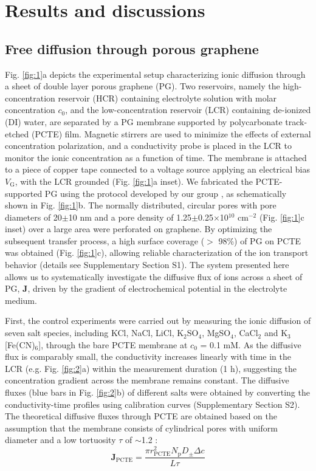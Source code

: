 \documentclass[journal=langd5,email=true, hyperref=true, keywords=false]{achemso}
\newcommand{\Fig}{Fig.}
\begin{document}
\section{Results and discussions}
\label{sec:res}

\subsection{Free diffusion through porous graphene}
\label{sec:res-1}

\Fig{} \ref{fig:1}a depicts the experimental setup characterizing
ionic diffusion through a sheet of double layer porous graphene
(PG). Two reservoirs, namely the high-concentration reservoir (HCR)
containing electrolyte solution with molar concentration $c_0$, and
the low-concentration reservoir (LCR) containing de-ionized (DI)
water, are separated by a PG membrane supported by polycarbonate
track-etched (PCTE) film. Magnetic stirrers are used to minimize the
effects of external concentration polarization, and a conductivity
probe is placed in the LCR to monitor the ionic concentration as a
function of time. The membrane is attached to a piece of copper tape
connected to a voltage source applying an electrical bias
$V_{\mathrm{G}}$, with the LCR grounded (\Fig{} \ref{fig:1}a
inset). We fabricated the PCTE-supported PG using the protocol
developed by our group \cite{Choi_2018}, as schematically shown in
\Fig{} \ref{fig:1}b. The normally distributed, circular pores with
pore diameters of 20$\pm$10 nm and a pore density of
1.25$\pm$0.25$\times$10$^{10}$ cm$^{-2}$ (\Fig{} \ref{fig:1}c inset) over a
large area were perforated on graphene.  By optimizing the subsequent
transfer process, a high surface coverage ($>$ 98\%) of PG on PCTE was
obtained (\Fig{} \ref{fig:1}c), allowing reliable characterization of
the ion transport behavior (details see Supplementary 
Section S1).  The system presented here allows us to systematically
investigate the diffusive flux of ions across a sheet of PG,
$\boldsymbol{J}$, driven by the gradient of electrochemical potential
in the electrolyte medium.

First, the control experiments were carried out by measuring the ionic
diffusion of seven salt species, including KCl, NaCl, LiCl,
K$_{2}$SO$_{4}$, MgSO$_{4}$, CaCl$_{2}$ and K$_{3}$[Fe(CN)$_{6}$],
through the bare PCTE membrane at $c_{0}$ = 0.1 mM. As the diffusive
flux is comparably small, the conductivity increases linearly with time in the LCR
(e.g. \Fig{} \ref{fig:2}a) within the measurement duration (1 h),
suggesting the concentration gradient across the membrane remains 
constant. The diffusive fluxes (blue bars in \Fig{} \ref{fig:2}b) of different salts were
obtained by converting the conductivity-time profiles using
calibration curves (Supplementary Section S2). The theoretical diffusive fluxes through PCTE are obtained based on the assumption that the
membrane consists of cylindrical pores with uniform diameter and a low
tortuosity $\tau$ of $\sim{}$1.2 \cite{O_Hern_2012}:
\begin{equation}
  \label{eq:j-pcte}
  \boldsymbol{J}_{\mathrm{PCTE}} = \frac{\pi r_{\mathrm{PCTE}}^{2} N_{\mathrm{p}} D_{\mathrm{\pm}} \Delta c}{L \tau}
\end{equation}
\end{document}
